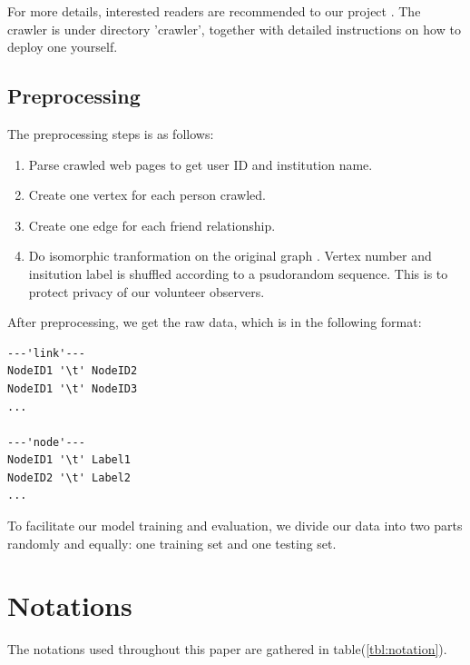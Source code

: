 \documentclass[11pt,a4paper]{article}
\begin{document}
For more details, interested readers are recommended to 
our project \cite{hu2011-cd2hop}. The crawler is under 
directory 'crawler', together with detailed instructions 
on how to deploy one yourself. 

\subsection{Preprocessing}

The preprocessing steps is as follows:
\begin{enumerate}
	\item Parse crawled web pages to get user ID and institution name. 
	\item Create one vertex for each person crawled. 
	\item Create one edge for each friend relationship. 
	\item Do isomorphic tranformation on the original graph
	\cite{wiki_iso_graph}. Vertex number and insitution label 
	is shuffled according to a psudorandom sequence. 
	This is to protect privacy of our volunteer observers. 
\end{enumerate}

After preprocessing, we get the raw data, which is in the
following format:
\begin{Verbatim}
---'link'---
NodeID1 '\t' NodeID2
NodeID1 '\t' NodeID3
...

---'node'---
NodeID1 '\t' Label1
NodeID2 '\t' Label2
...
\end{Verbatim}

To facilitate our model training and evaluation, 
we divide our data into two parts randomly and equally: 
one training set and one testing set. 

\section{Notations}

The notations used throughout this paper are gathered 
in table(\ref{tbl:notation}). 
\end{document}
